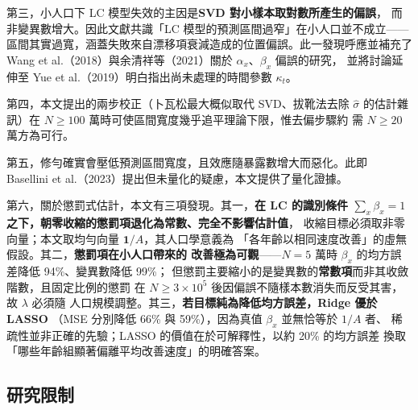 \documentclass[UTF8, fontset=macnew, a4paper, 12pt]{ctexart}
\begin{document}
第三，小人口下 LC 模型失效的主因是\textbf{SVD 對小樣本取對數所產生的偏誤}，
而非變異數增大。因此文獻共識「LC 模型的預測區間過窄」在小人口並不成立——
區間其實過寬，涵蓋失敗來自漂移項衰減造成的位置偏誤。此一發現呼應並補充了
Wang et al.（2018）與余清祥等（2021）關於 $\alpha_x$、$\beta_x$ 偏誤的研究，
並將討論延伸至 Yue et al.（2019）明白指出尚未處理的時間參數 $\kappa_t$。

第四，本文提出的兩步校正（卜瓦松最大概似取代 SVD、拔靴法去除 $\hat\sigma$
的估計雜訊）在 $N\ge100$ 萬時可使區間寬度幾乎追平理論下限，惟去偏步驟約
需 $N\ge20$ 萬方為可行。

第五，修勻確實會壓低預測區間寬度，且效應隨暴露數增大而惡化。此即
Basellini et al.（2023）提出但未量化的疑慮，本文提供了量化證據。

第六，關於懲罰式估計，本文有三項發現。其一，\textbf{在 LC 的識別條件
$\sum_x\beta_x=1$ 之下，朝零收縮的懲罰項退化為常數、完全不影響估計值}，
收縮目標必須取非零向量；本文取均勻向量 $\mathbf{1}/A$，其人口學意義為
「各年齡以相同速度改善」的虛無假設。其二，\textbf{懲罰項在小人口帶來的
改善極為可觀}——$N=5$ 萬時 $\beta_x$ 的均方誤差降低 94\%、變異數降低 99\%；
但懲罰主要縮小的是變異數的\textbf{常數項}而非其收斂階數，且固定比例的懲罰
在 $N\ge3\times10^5$ 後因偏誤不隨樣本數消失而反受其害，故 $\lambda$ 必須隨
人口規模調整。其三，\textbf{若目標純為降低均方誤差，Ridge 優於 LASSO}
（MSE 分別降低 66\% 與 59\%），因為真值 $\beta_x$ 並無恰等於 $1/A$ 者、
稀疏性並非正確的先驗；LASSO 的價值在於可解釋性，以約 20\% 的均方誤差
換取「哪些年齡組顯著偏離平均改善速度」的明確答案。

\subsection{研究限制}
\end{document}
